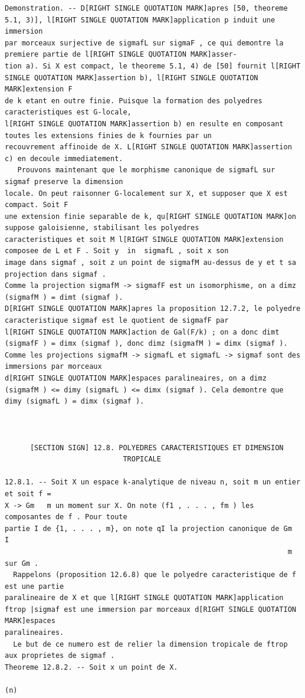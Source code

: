 \documentclass[
  11pt,
]{article}
\begin{document}
\begin{lstlisting}
Demonstration. -- D[RIGHT SINGLE QUOTATION MARK]apres [50, theoreme 5.1, 3)], l[RIGHT SINGLE QUOTATION MARK]application p induit une immersion
par morceaux surjective de sigmafL sur sigmaF , ce qui demontre la premiere partie de l[RIGHT SINGLE QUOTATION MARK]asser-
tion a). Si X est compact, le theoreme 5.1, 4) de [50] fournit l[RIGHT SINGLE QUOTATION MARK]assertion b), l[RIGHT SINGLE QUOTATION MARK]extension F
de k etant en outre finie. Puisque la formation des polyedres caracteristiques est G-locale,
l[RIGHT SINGLE QUOTATION MARK]assertion b) en resulte en composant toutes les extensions finies de k fournies par un
recouvrement affinoide de X. L[RIGHT SINGLE QUOTATION MARK]assertion c) en decoule immediatement.
   Prouvons maintenant que le morphisme canonique de sigmafL sur sigmaf preserve la dimension
locale. On peut raisonner G-localement sur X, et supposer que X est compact. Soit F
une extension finie separable de k, qu[RIGHT SINGLE QUOTATION MARK]on suppose galoisienne, stabilisant les polyedres
caracteristiques et soit M l[RIGHT SINGLE QUOTATION MARK]extension composee de L et F . Soit y  in  sigmafL , soit x son
image dans sigmaf , soit z un point de sigmafM au-dessus de y et t sa projection dans sigmaf .
Comme la projection sigmafM -> sigmafF est un isomorphisme, on a dimz (sigmafM ) = dimt (sigmaf ).
D[RIGHT SINGLE QUOTATION MARK]apres la proposition 12.7.2, le polyedre caracteristique sigmaf est le quotient de sigmafF par
l[RIGHT SINGLE QUOTATION MARK]action de Gal(F/k) ; on a donc dimt (sigmafF ) = dimx (sigmaf ), donc dimz (sigmafM ) = dimx (sigmaf ).
Comme les projections sigmafM -> sigmafL et sigmafL -> sigmaf sont des immersions par morceaux
d[RIGHT SINGLE QUOTATION MARK]espaces paralineaires, on a dimz (sigmafM ) <= dimy (sigmafL ) <= dimx (sigmaf ). Cela demontre que
dimy (sigmafL ) = dimx (sigmaf ).



      [SECTION SIGN] 12.8. POLYEDRES CARACTERISTIQUES ET DIMENSION
                            TROPICALE

12.8.1. -- Soit X un espace k-analytique de niveau n, soit m un entier et soit f =
X -> Gm   m un moment sur X. On note (f1 , . . . , fm ) les composantes de f . Pour toute
partie I de {1, . . . , m}, on note qI la projection canonique de Gm      I
                                                                   m sur Gm .
  Rappelons (proposition 12.6.8) que le polyedre caracteristique de f est une partie
paralineaire de X et que l[RIGHT SINGLE QUOTATION MARK]application ftrop |sigmaf est une immersion par morceaux d[RIGHT SINGLE QUOTATION MARK]espaces
paralineaires.
  Le but de ce numero est de relier la dimension tropicale de ftrop aux proprietes de sigmaf .
Theoreme 12.8.2. -- Soit x un point de X.
                                                                    (n)
\end{lstlisting}
\end{document}
